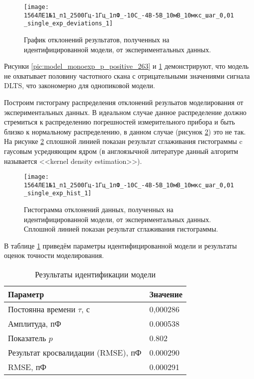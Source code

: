 	\begin{figure}[!htp]
		\centering
		\texttt{[image: 1564ЛЕ1№1\_п1\_2500Гц-1Гц\_1пФ\_-10С\_-4В-5В\_10мВ\_10мкс\_шаг\_0,01\_single\_exp\_deviations\_1]}
		\caption{График отклонений результатов, полученных на идентифицированной
		модели, от экспериментальных данных.}
		\label{pic:deviations_monoexp_p_positive_263}
	\end{figure}

	Рисунки \ref{pic:model_monoexp_p_positive_263} и 
	\ref{pic:deviations_monoexp_p_positive_263} демонстрируют, что модель не 
	охватывает половину частотного скана с отрицательными значениями сигнала
	DLTS, что закономерно для однопиковой модели.

	Построим гистограму распределения отклонений резульатов моделирования от
	экспериментальных данных. В идеальном случае данное распределение должно
	стремиться к распределению погрешностей измерительного прибора и быть близко
	к нормальному распределению, в данном случае (рисунок 
	\ref{pic:hist_monoexp_p_positive_263}) это не так. На рисунке 
	\ref{pic:hist_monoexp_p_positive_263} сплошной линией показан результат
	сглаживания гистограммы c гаусовым усредняющим ядром (в англоязычной 
	литературе данный алгоритм называется <<kernel density estimation>>).

	\begin{figure}[!htp]
		\centering
		\texttt{[image: 1564ЛЕ1№1\_п1\_2500Гц-1Гц\_1пФ\_-10С\_-4В-5В\_10мВ\_10мкс\_шаг\_0,01\_single\_exp\_hist\_1]}
		\caption{Гистограмма отклонений данных, полученных на идентифицированной 
		         модели, от экспериментальных данных. Сплошной линией показан 
		         результат сглаживания гистограммы.}
		\label{pic:hist_monoexp_p_positive_263}
	\end{figure}

	В таблице \ref{table:results_monoexp_p_positive_263} приведём параметры 
	идентифицированной модели и результаты оценок точности моделирования.

	\begin{table}[!htp]
    	\centering
    	\caption{Результаты идентификации модели}
		\begin{tabular}{|l|l|}
			\hline
			Параметр                           & Значение  \\ \hline
			Постоянна времени $\tau$, с        & 0,000286  \\ \hline
			Амплитуда, пФ                      & 0.000538  \\ \hline
			Показатель $p$                     & 0.802     \\ \hline
			Результат кросвалидации (RMSE), пФ & 0.000290  \\ \hline
			RMSE, пФ                           & 0.000291  \\ \hline
		\end{tabular}
		\label{table:results_monoexp_p_positive_263}
	\end{table}

